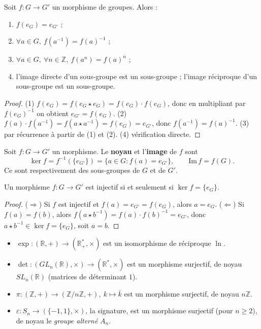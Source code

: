 \begin{proposition}
Soit $f : G \to G'$ un morphisme de groupes. Alors :
\begin{enumerate}
    \item $f(e_G) = e_{G'}$ ;
    \item $\forall a \in G,\ f(a^{-1}) = f(a)^{-1}$ ;
    \item $\forall a \in G,\ \forall n \in \mathbb{Z},\ f(a^n) = f(a)^n$ ;
    \item l'image directe d'un sous-groupe est un sous-groupe ; l'image réciproque d'un sous-groupe est un sous-groupe.
\end{enumerate}
\end{proposition}

\begin{proof}
(1) $f(e_G) = f(e_G \star e_G) = f(e_G) \cdot f(e_G)$, donc en multipliant par $f(e_G)^{-1}$ on obtient $e_{G'} = f(e_G)$. (2) $f(a) \cdot f(a^{-1}) = f(a \star a^{-1}) = f(e_G) = e_{G'}$, donc $f(a^{-1}) = f(a)^{-1}$. (3) par récurrence à partir de (1) et (2). (4) vérification directe.
\end{proof}

\begin{definition}
Soit $f : G \to G'$ un morphisme. Le \textbf{noyau} et l'\textbf{image} de $f$ sont
\[ \ker f = f^{-1}(\{e_{G'}\}) = \{a \in G : f(a) = e_{G'}\}, \qquad \mathrm{Im}\, f = f(G). \]
Ce sont respectivement des sous-groupes de $G$ et de $G'$.
\end{definition}

\begin{proposition}
Un morphisme $f : G \to G'$ est injectif si et seulement si $\ker f = \{e_G\}$.
\end{proposition}

\begin{proof}
($\Rightarrow$) Si $f$ est injectif et $f(a) = e_{G'} = f(e_G)$, alors $a = e_G$. ($\Leftarrow$) Si $f(a) = f(b)$, alors $f(a \star b^{-1}) = f(a) \cdot f(b)^{-1} = e_{G'}$, donc $a \star b^{-1} \in \ker f = \{e_G\}$, soit $a = b$.
\end{proof}

\begin{exemple}
\begin{itemize}
    \item $\exp : (\mathbb{R}, +) \to (\mathbb{R}^*_+, \times)$ est un isomorphisme de réciproque $\ln$.
    \item $\det : (GL_n(\mathbb{R}), \times) \to (\mathbb{R}^*, \times)$ est un morphisme surjectif, de noyau $SL_n(\mathbb{R})$ (matrices de déterminant $1$).
    \item $\pi : (\mathbb{Z}, +) \to (\mathbb{Z}/n\mathbb{Z}, +),\ k \mapsto \bar{k}$ est un morphisme surjectif, de noyau $n\mathbb{Z}$.
    \item $\varepsilon : S_n \to (\{-1, 1\}, \times)$, la signature, est un morphisme surjectif (pour $n \ge 2$), de noyau le \emph{groupe alterné} $A_n$.
\end{itemize}
\end{exemple}

